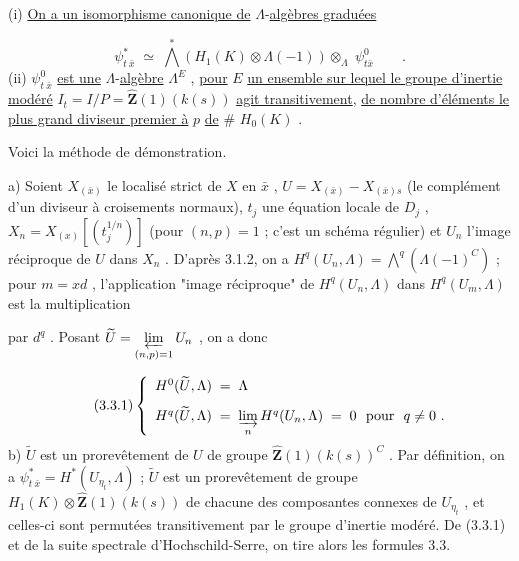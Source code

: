 (i) \underline{On a un isomorphisme canonique de} $\Lambda$-\underline{algèbres graduées}

\begin{equation*}
\psi^{*}_{t\ \bar{x}} \;\simeq\; \overset{*}{\bigwedge}(H_{1}(K) \otimes \Lambda(-1)) \otimes_{\Lambda} \; \psi^{0}_{t\bar{x}} \qquad .
\end{equation*}
(ii) $\psi^{0}_{t\ \bar{x}}$ \underline{est une} $\Lambda$-\underline{algèbre} $\Lambda^{E}$ , \underline{pour} $E$ \underline{un ensemble sur lequel le groupe d'inertie modéré} $I_{t} = I/P = \hat{\mathbf{Z}}(1)(k(s))$ \underline{agit transitivement}, \underline{de nombre d'éléments le plus grand diviseur premier à} $p$ \underline{de} $\#$ $H_{0}(K)$ .

Voici la méthode de démonstration.

a) Soient  $X_{(\bar{x})}$  le localisé strict de  $X$  en  $\bar{x}$ , $U = X_{(\bar{x})} - X_{(\bar{x})s}$  (le complément d'un diviseur à croisements normaux), $t_{j}$  une équation locale de  $D_{j}$ , $X_{n} = X_{(x)}\left[(t_{j}^{1/n})\right]$ (pour  $(n,p) = 1$ ; c'est un schéma régulier) et  $U_{n}$  l'image réciproque de  $U$  dans  $X_{n}$ . D'après 3.1.2, on a  $H^{q}(U_{n},\Lambda) = \overset{q}{\bigwedge}(\Lambda(-1)^{C})$  ; pour  $m = x d$ , l'application "image réciproque" de  $H^{q}(U_{n},\Lambda)$  dans  $H^{q}(U_{m},\Lambda)$  est la multiplication



par  $d^{q}$ . Posant  $\widetilde{U} = \varprojlim\limits_{(n,p)=1} U_{n}$ , on a donc

\begin{equation}\tag{3.3.1}
\left\{\begin{array}{l} H^{0}(\widetilde{U},\Lambda) \;=\; \Lambda \\[8pt] H^{q}(\widetilde{U},\Lambda) \;=\; \varinjlim\limits_{n} H^{q}(U_{n},\Lambda) \;=\; 0 \ \ \text{pour}\ \ q \neq 0 \ . \end{array}\right.
\end{equation}
b) $\widetilde{U}$  est un prorevêtement de  $U$  de groupe  $\hat{\mathbf{Z}}(1)(k(s))^{C}$ . Par définition, on a  $\psi^{*}_{t\ \bar{x}} = H^{*}(U_{\eta_{t}} ,\Lambda)$ ; $\widetilde{U}$  est un prorevêtement de groupe  $H_{1}(K) \otimes \hat{\mathbf{Z}}(1)(k(s))$  de chacune des composantes connexes de  $U_{\eta_{t}}$ , et celles-ci sont permutées transitivement par le groupe d'inertie modéré. De (3.3.1) et de la suite spectrale d'Hochschild-Serre, on tire alors les formules 3.3.

